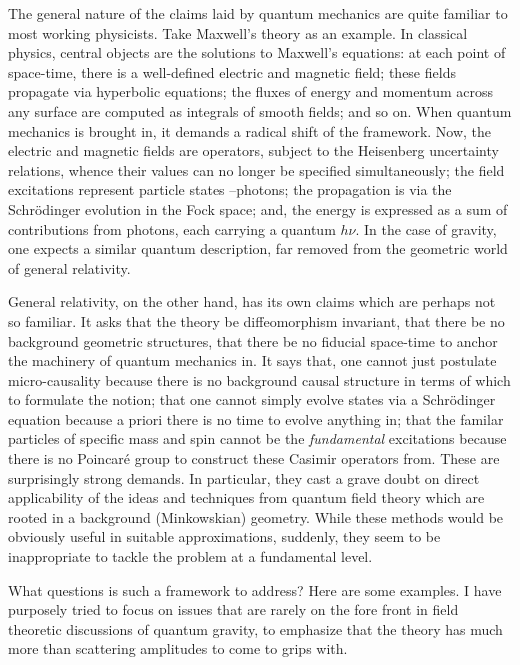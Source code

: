 The general nature of the claims laid by quantum mechanics are quite
familiar to most working physicists. Take Maxwell's theory as an example.
In classical physics, central objects are the solutions to Maxwell's
equations: at each point of space-time, there is a well-defined electric
and magnetic field; these fields propagate via hyperbolic equations;
the fluxes of energy and momentum across any surface are computed
as integrals of smooth fields; and so on. When quantum mechanics is brought
in, it demands a radical shift of the framework. Now, the electric and
magnetic fields are operators, subject to the Heisenberg uncertainty relations,
whence their values can no longer be specified simultaneously; the field
excitations represent particle states --photons; the propagation is via the
Schr\"odinger evolution in the Fock space; and, the energy is expressed as a
sum of contributions from photons, each carrying a quantum $h\nu$. In the
case of gravity, one expects a similar quantum description, far removed from
the geometric world of general relativity.

General relativity, on the other
hand, has its own claims which are perhaps not so familiar. It asks that
the theory be diffeomorphism invariant, that there be no background
geometric structures, that there be no fiducial space-time to anchor the
machinery of quantum mechanics in. It says that, one cannot just postulate
micro-causality because there is no background causal structure in terms
of which to formulate the notion; that one cannot simply evolve states via a
Schr\"odinger equation because a priori there is no time to evolve anything
in; that the familar particles of specific mass and spin cannot be the
{\it fundamental} excitations because there is no Poincar\'e group to
construct these Casimir operators from. These are surprisingly strong
demands. In particular, they cast a grave doubt on direct applicability
of the ideas and techniques from quantum field theory which are rooted
in a background (Minkowskian) geometry. While these methods would be
obviously useful in suitable approximations, suddenly, they seem to be
inappropriate to tackle the problem at a fundamental level.

What questions is such a framework to address? Here are some examples.
I have purposely tried to focus on issues that are rarely on the fore
front in field theoretic discussions of quantum gravity, to emphasize
that the theory has much more than scattering amplitudes to come to grips
with.

